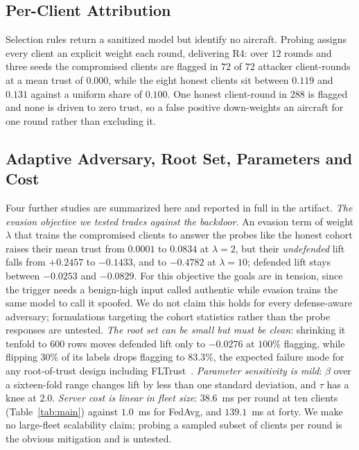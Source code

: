 \documentclass[conference]{IEEEtran}
\begin{document}
\subsection{Per-Client Attribution}
\label{sec:attrib}

Selection rules return a sanitized model but identify no aircraft. Probing
assigns every client an explicit weight each round, delivering R4: over $12$
rounds and three seeds the compromised clients are flagged in $72$ of $72$
attacker client-rounds at a mean trust of $0.000$, while the eight honest
clients sit between $0.119$ and $0.131$ against a uniform share of $0.100$. One
honest client-round in $288$ is flagged and none is driven to zero trust, so a
false positive down-weights an aircraft for one round rather than excluding it.


\subsection{Adaptive Adversary, Root Set, Parameters and Cost}
\label{sec:cost}

Four further studies are summarized here and reported in full in the artifact.
\emph{The evasion objective we tested trades against the backdoor.} An evasion
term of weight $\lambda$ that trains the compromised clients to answer the
probes like the honest cohort raises their mean trust from $0.0001$ to $0.0834$
at $\lambda=2$, but their \emph{undefended} lift falls from $+0.2457$ to
$-0.1433$, and to $-0.4782$ at $\lambda=10$; defended lift stays between
$-0.0253$ and $-0.0829$. For this objective the goals are in tension, since the
trigger needs a benign-high input called authentic while evasion trains the
same model to call it spoofed. We do not claim this holds for every
defense-aware adversary; formulations targeting the cohort statistics rather
than the probe responses are untested.
\emph{The root set can be small but must be clean}: shrinking it tenfold to
$600$ rows moves defended lift only to $-0.0276$ at $100\%$ flagging, while
flipping $30\%$ of its labels drops flagging to $83.3\%$, the expected failure
mode for any root-of-trust design including FLTrust~\cite{cao2021fltrust}.
\emph{Parameter sensitivity is mild}: $\beta$ over a sixteen-fold range changes
lift by less than one standard deviation, and $\tau$ has a knee at $2.0$.
\emph{Server cost is linear in fleet size}: $38.6$~ms per round at ten clients
(Table~\ref{tab:main}) against $1.0$~ms for FedAvg, and $139.1$~ms at forty. We
make no large-fleet scalability claim; probing a sampled subset of clients per
round is the obvious mitigation and is untested.
\end{document}
